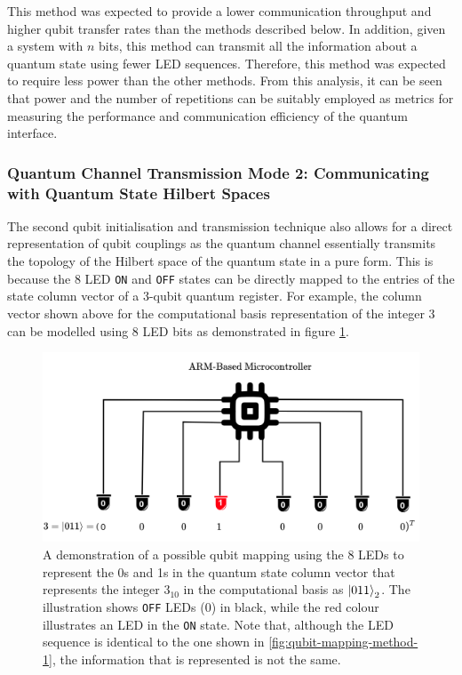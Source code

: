 This method was expected to provide a lower communication throughput and higher qubit transfer rates than the methods described below. In addition, given a system with $n$ bits, this method can transmit all the information about a quantum state using fewer LED sequences. Therefore, this method was expected to require less power than the other methods. From this analysis, it can be seen that power and the number of repetitions can be suitably employed as metrics for measuring the performance and communication efficiency of the quantum interface. 

\subsubsection{Quantum Channel Transmission Mode 2: Communicating with Quantum State Hilbert Spaces}
The second qubit initialisation and transmission technique also allows for a direct representation of qubit couplings as the quantum channel essentially transmits the topology of the Hilbert space of the quantum state in a pure form. This is because the 8 LED \texttt{ON} and \texttt{OFF} states can be directly mapped to the entries of the state column vector of a 3-qubit quantum register. For example, the column vector shown above for the computational basis representation of the integer 3 can be modelled using 8 LED bits as demonstrated in figure \ref{fig:led-qubit-mapping}. \\ 
\begin{figure}[!ht]
	\centering
	\includegraphics[width=1.0\linewidth]{body/ch4/figs/qubit-mapping-leds}
	\caption[Qubit Mapping Using LEDs to Represent 0s and 1s in Quantum State Vectors in the Computational Basis.]{A demonstration of a possible qubit mapping using the 8 LEDs to represent the 0s and 1s in the quantum state column vector that represents the integer $3_{10}$ in the computational basis as $\ket{011}_2$. The illustration shows \texttt{OFF} LEDs (0) in black, while the red colour illustrates an LED in the \texttt{ON} state. Note that, although the LED sequence is identical to the one shown in \ref{fig:qubit-mapping-method-1}, the information that is represented is not the same.}
	\label{fig:led-qubit-mapping}
\end{figure}
